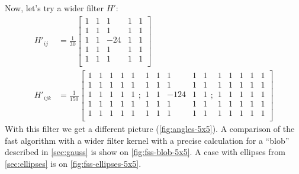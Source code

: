 \documentclass[reprint,amsmath,amssymb,aps,pre,showkeys,showpacs]{revtex4-1}
\begin{document}
Now, let's try a wider filter $H'$:
\begin{align}
  H'_{ij} &= \frac{1}{30} \left[
    \begin{array}{ccccc}
      1 & 1 & 1 & 1 & 1 \\
      1 & 1 & 1 & 1 & 1 \\
      1 & 1 & -24 & 1 & 1 \\
      1 & 1 & 1 & 1 & 1 \\
      1 & 1 & 1 & 1 & 1 \\
    \end{array}
    \right] \label{eq:filter-5x5-2d} \\
  H'_{ijk} &= \frac{1}{150} \left[
    \begin{array}{ccccc}
      1 & 1 & 1 & 1 & 1 \\
      1 & 1 & 1 & 1 & 1 \\
      1 & 1 & 1 & 1 & 1 \\
      1 & 1 & 1 & 1 & 1 \\
      1 & 1 & 1 & 1 & 1 \\
    \end{array} ;
    \begin{array}{ccccc}
      1 & 1 & 1 & 1 & 1 \\
      1 & 1 & 1 & 1 & 1 \\
      1 & 1 & -124 & 1 & 1 \\
      1 & 1 & 1 & 1 & 1 \\
      1 & 1 & 1 & 1 & 1 \\
    \end{array} ;
    \begin{array}{ccccc}
      1 & 1 & 1 & 1 & 1 \\
      1 & 1 & 1 & 1 & 1 \\
      1 & 1 & 1 & 1 & 1 \\
      1 & 1 & 1 & 1 & 1 \\
      1 & 1 & 1 & 1 & 1 \\
    \end{array}
    \right] \label{eq:filter-5x5-3d}
\end{align}
With this filter we get a different picture (\cref{fig:angles-5x5}). A
comparison of the fast algorithm with a wider filter kernel with a precise
calculation for a ``blob'' described in \cref{sec:gauss} is show on
\cref{fig:fss-blob-5x5}. A case with ellipses from \cref{sec:ellipses} is on
\cref{fig:fss-ellipses-5x5}.
\end{document}

